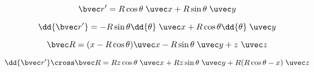 
\begin{issues}
\issueDraft
\end{issues}

\begin{equation}
\bvec r' = R\cos\theta\; \uvec x + R\sin\theta\; \uvec y
\end{equation}

\begin{equation}
\dd{\bvec r'} = -R\sin \theta \dd{\theta}\; \uvec x + R\cos \theta \dd{\theta}\; \uvec y
\end{equation}

\begin{equation}
\bvec R = (x - R\cos\theta)\uvec x -R\sin\theta \;\uvec y+ z\ \uvec z
\end{equation}

\begin{equation}
\dd{\bvec r'} \cross \bvec R = Rz \cos\theta \;\uvec x + Rz\sin\theta \;\uvec y + R(R \cos\theta - x)\;\uvec z
\end{equation}

